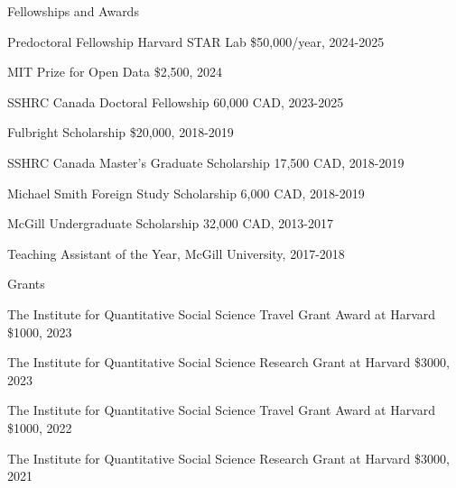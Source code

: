 \documentclass{resume}
\begin{document}
\bigskip

\begin{rSection}{\Large F\MakeLowercase{ellowships and}  A\MakeLowercase{wards}} \itemsep -2pt
\vspace{-0.7cm}
\item Predoctoral Fellowship Harvard STAR Lab \$50,000/year, 2024-2025
\item MIT Prize for Open Data \$2,500, 2024
\item SSHRC Canada Doctoral Fellowship 60,000 CAD, 2023-2025 
\item Fulbright Scholarship \$20,000, 2018-2019
\item SSHRC Canada Master's Graduate Scholarship 17,500 CAD, 2018-2019 
\item Michael Smith Foreign Study Scholarship 6,000 CAD, 2018-2019
\item McGill Undergraduate Scholarship 32,000 CAD, 2013-2017
\item Teaching Assistant of the Year, McGill University, 2017-2018
\end{rSection}

\bigskip


\begin{rSection}{\Large G\MakeLowercase{rants}} \itemsep -2pt
\vspace{-0.7cm}
\item The Institute for Quantitative Social Science Travel Grant Award at Harvard \$1000, 2023
\item The Institute for Quantitative Social Science Research Grant at Harvard \$3000, 2023
\item The Institute for Quantitative Social Science Travel Grant Award at Harvard \$1000, 2022
\item The Institute for Quantitative Social Science Research Grant at Harvard \$3000, 2021
\end{rSection}


\newpage
\end{document}
